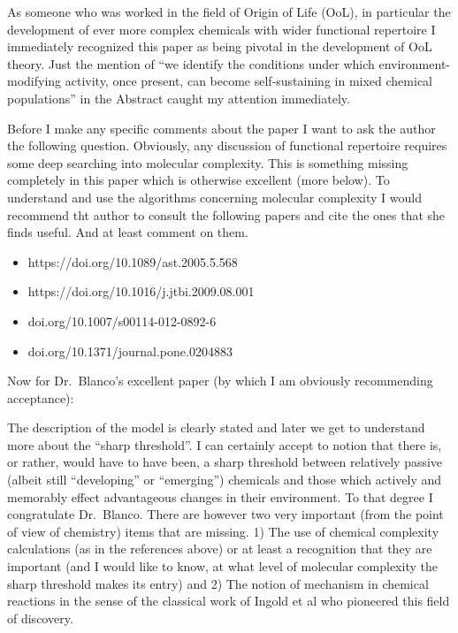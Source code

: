 \documentclass[11pt]{article}
\newcommand{\RC}[1]{\medskip\noindent #1\par}
\begin{document}
\RC{As someone who was worked in the field of Origin of Life (OoL), in particular the development of ever more complex chemicals with wider functional repertoire I immediately recognized this paper as being pivotal in the development of OoL theory. Just the mention of ``we identify the conditions under which environment-modifying activity, once present, can become self-sustaining in mixed chemical populations'' in the Abstract caught my attention immediately.

Before I make any specific comments about the paper I want to ask the author the following question. Obviously, any discussion of functional repertoire requires some deep searching into molecular complexity. This is something missing completely in this paper which is otherwise excellent (more below). To understand and use the algorithms concerning molecular complexity I would recommend tht author to consult the following papers and cite the ones that she finds useful. And at least comment on them.

\vspace{-0.5\parskip}
\begin{itemize}[nosep,topsep=0pt,partopsep=0pt]
\item https://doi.org/10.1089/ast.2005.5.568
\item https://doi.org/10.1016/j.jtbi.2009.08.001
\item doi.org/10.1007/s00114-012-0892-6
\item doi.org/10.1371/journal.pone.0204883
\end{itemize}
\vspace{-0.5\parskip}

Now for Dr.\ Blanco's excellent paper (by which I am obviously recommending acceptance):

The description of the model is clearly stated and later we get to understand more about the ``sharp threshold''. I can certainly accept to notion that there is, or rather, would have to have been, a sharp threshold between relatively passive (albeit still ``developing'' or ``emerging'') chemicals and those which actively and memorably effect advantageous changes in their environment. To that degree I congratulate Dr.\ Blanco. There are however two very important (from the point of view of chemistry) items that are missing. 1) The use of chemical complexity calculations (as in the references above) or at least a recognition that they are important (and I would like to know, at what level of molecular complexity the sharp threshold makes its entry) and 2) The notion of mechanism in chemical reactions in the sense of the classical work of Ingold et al who pioneered this field of discovery.}
\end{document}
